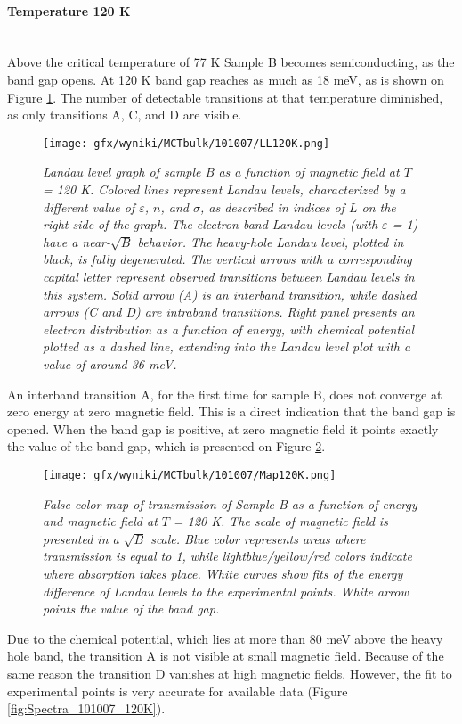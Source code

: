 \documentclass[titlepage,a4paper]{book}
\newcommand{\wciecie}{\quad\phantom{v}}
\newcommand{\myparagraph}[1]{\paragraph{#1}\mbox{}\\}
\begin{document}
\clearpage
\myparagraph{Temperature 120 K}
\wciecie
Above the critical temperature of 77 K Sample B becomes semiconducting, as the band gap opens. At 120 K band gap reaches as much as 18 meV, as is shown on Figure \ref{fig:LL_101007_120K}. The number of detectable transitions at that temperature diminished, as only transitions A, C, and D are visible.  
\begin{figure}[ht]
	\centering
	\texttt{[image: gfx/wyniki/MCTbulk/101007/LL120K.png]}
	\vspace{-10pt}
	\caption{\textit{Landau level graph of sample B as a function of magnetic field at $T$ = 120 K. Colored lines represent Landau levels, characterized by a different value of $\varepsilon$, $n$, and $\sigma$, as described in indices of $L$ on the right side of the graph. The electron band Landau levels (with $\varepsilon$ = 1) have a near-$\sqrt{B}$ behavior. The heavy-hole Landau level, plotted in black, is fully degenerated. The vertical arrows with a corresponding capital letter represent observed transitions between Landau levels in this system. Solid arrow (A) is an interband transition, while dashed arrows (C and D) are intraband transitions. Right panel presents an electron distribution as a function of energy, with chemical potential plotted as a dashed line, extending into the Landau level plot with a value of around 36 meV.}}
	\label{fig:LL_101007_120K}
\end{figure}

An interband transition A, for the first time for sample B, does not converge at zero energy at zero magnetic field. This is a direct indication that the band gap is opened. When the band gap is positive, at zero magnetic field it points exactly the value of the band gap, which is presented on Figure \ref{fig:Map_101007_120K}. 
\begin{figure}[ht]
	\centering
	\texttt{[image: gfx/wyniki/MCTbulk/101007/Map120K.png]}
	\vspace{-10pt}
	\caption{\textit{False color map of transmission of Sample B as a function of energy and magnetic field at $T$ = 120 K. The scale of magnetic field is presented in a $\sqrt{B}$ scale. Blue color represents areas where transmission is equal to 1, while lightblue/yellow/red colors indicate where absorption takes place. White curves show fits of the energy difference of Landau levels to the experimental points. White arrow points the value of the band gap.}}
	\label{fig:Map_101007_120K}
\end{figure} 
Due to the chemical potential, which lies at more than 80 meV above the heavy hole band, the transition A is not visible at small magnetic field. Because of the same reason the transition D vanishes at high magnetic fields. However, the fit to experimental points is very accurate for available data (Figure \ref{fig:Spectra_101007_120K}). 
\end{document}
